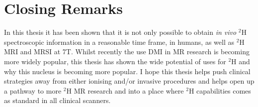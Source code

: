 \section{Closing Remarks}

In this thesis it has been shown that it is not only possible to obtain \textit{in vivo} $^2$H spectroscopic information in a reasonable time frame, in humans, as well as $^2$H \ac{MRI} and \ac{MRSI} at 7T. Whilst recently the use \ac{DMI} in MR research is becoming more widely popular, this thesis has shown the wide potential of uses for $^2$H and why this nucleus is becoming more popular. I hope this thesis helps push clinical strategies away from either ionising and/or invasive procedures and helps open up a pathway to more $^2$H MR research and into a place where $^2$H capabilities comes as standard in all clinical scanners.